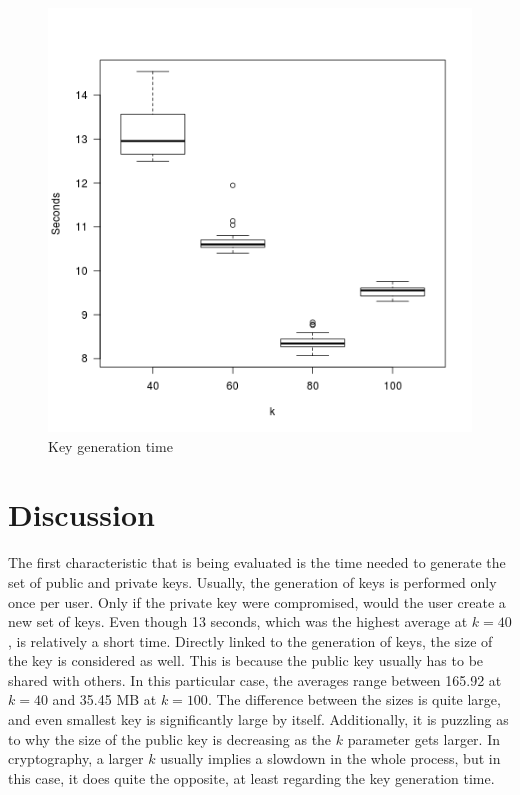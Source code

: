 \begin{figure}[H]
  \centerline{\includegraphics[width=13cm]{img/keygenplot}}
  \caption{Key generation time}
\end{figure}


\section{Discussion}

The first characteristic that is being evaluated is the time needed to generate the set of public and private keys. Usually, the generation of keys is performed only once per user. Only if the private key were compromised, would the user create a new set of keys. Even though 13 seconds, which was the highest average at $k=40$, is relatively a short time. Directly linked to the generation of keys, the size of the key is considered as well. This is because the public key usually has to be shared with others. In this particular case, the averages range between 165.92 at $k=40$  and 35.45 MB at $k=100$. The difference between the sizes is quite large, and even smallest key is significantly large by itself. Additionally, it is puzzling as to why the size of the public key is decreasing as the $k$ parameter gets larger. In cryptography, a larger $k$ usually implies a slowdown in the whole process, but in this case, it does quite the opposite, at least regarding the key generation time.

